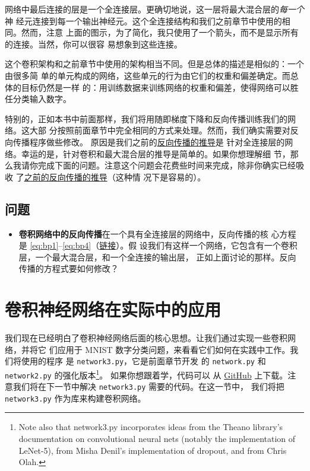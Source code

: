 网络中最后连接的层是一个全连接层。更确切地说，这一层将最大混合层的\emph{每一个}神
经元连接到每一个输出神经元。这个全连接结构和我们之前章节中使用的相同。然而，注意
上面的图示，为了简化，我只使用了一个箭头，而不是显示所有的连接。当然，你可以很容
易想象到这些连接。

这个卷积架构和之前章节中使用的架构相当不同。但是总体的描述是相似的：一个由很多简
单的单元构成的网络，这些单元的行为由它们的权重和偏差确定。而总体的目标仍然是一样
的：用训练数据来训练网络的权重和偏差，使得网络可以胜任分类输入数字。

特别的，正如本书中前面那样，我们将用随即梯度下降和反向传播训练我们的网络。这大部
分按照前面章节中完全相同的方式来处理。然而，我们确实需要对反向传播程序做些修改。
原因是我们之前的\hyperref[ch:HowThebackpropagationalgorithmworks]{反向传播的推导}是
针对全连接层的网络。幸运的是，针对卷积和最大混合层的推导是简单的。如果你想理解细
节，那么我请你完成下面的问题。注意这个问题会花费些时间来完成，除非你确实已经吸收
了\hyperref[ch:HowThebackpropagationalgorithmworks]{之前的反向传播的推导}（这种情
况下是容易的）。

\subsection*{问题}

\begin{itemize}
\item \textbf{卷积网络中的反向传播}\quad 在一个具有全连接层的网络中，反向传播的核
  心方程是 \eqref{eq:bp1}--\eqref{eq:bp4}（\hyperref[backpropsummary]{链接}）。假
  设我们有这样一个网络，它包含有一个卷积层，一个最大混合层，和一个全连接的输出层，
  正如上面讨论的那样。反向传播的方程式要如何修改？
\end{itemize}

\section{卷积神经网络在实际中的应用}
\label{seq:convolutional_neural_networks_in_practice}

我们现在已经明白了卷积神经网络后面的核心思想。让我们通过实现一些卷积网络，并将它
们应用于 MNIST 数字分类问题，来看看它们如何在实践中工作。我们将使用的程序
是 \lstinline!network3.py!，它是前面章节开发
的 \lstinline!network.py! 和 \lstinline!network2.py! 的强化版本\footnote{Note
  also that network3.py incorporates ideas from the Theano library's
  documentation on convolutional neural nets (notably the implementation of
  LeNet-5), from Misha Denil's implementation of dropout, and from Chris Olah.}。
如果你想跟着学，代码可以
从
\href{https://github.com/mnielsen/neural-networks-and-deep-learning/blob/master/src/network3.py}{GitHub}
上下载。注意我们将在下一节中解决 \lstinline!network3.py! 需要的代码。在这一节中，
我们将把 \lstinline!network3.py! 作为库来构建卷积网络。

